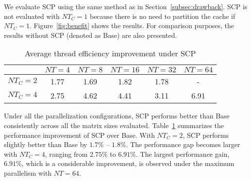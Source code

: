 We evaluate SCP using the same method as in Section~\ref{subsec:drawback}.
SCP is not evaluated with $NT_C=1$ because there is no need
to partition the cache if $NT_C=1$.
Figure~\ref{fig:benefit} shows the results.
For comparison purposes, the results without SCP
(denoted as Base) are also presented.

\begin{table}
  \centering
  \caption{Average thread efficiency improvement under SCP}
  \label{tab:win}
  \setlength{\tabcolsep}{3.5pt}
  \begin{tabular}{cccccc}
    \toprule
     & $NT=4$ & $NT=8$ & $NT=16$ & $NT=32$ & $NT=64$ \\
    \midrule
    $NT_C=2$ & 1.77 & 1.69 & 1.82 & 1.78 & - \\
    $NT_C=4$ & 2.75 & 4.62 & 4.41 & 3.11 & 6.91 \\
    \bottomrule
  \end{tabular}
\end{table}


Under all the parallelization configurations, 
SCP performs better than Base
consistently across all the matrix sizes evaluated.
Table~\ref{tab:win} summarizes the performance improvement of SCP over Base.
With $NT_C=2$, SCP performs slightly better than Base
by $1.7\%$ -- $1.8\%$.
The performance gap becomes larger with $NT_C=4$,
ranging from $2.75\%$ to $6.91\%$.
The largest performance gain, $6.91\%$, which is a considerable improvement,
is observed under the maximum parallelism with $NT=64$.



